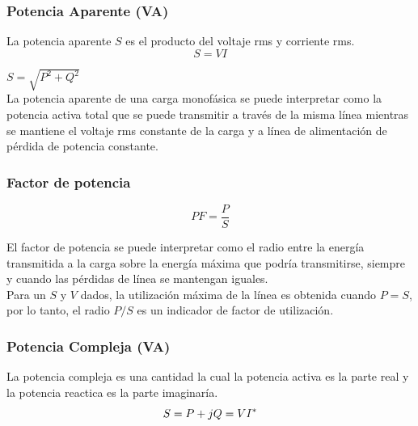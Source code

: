 \subsubsection{Potencia Aparente (VA)}

La potencia aparente $S$ es el producto del voltaje rms y corriente rms.\cite{A30}\\

\begin{equation}\label{EQ19}
S=VI
\end{equation}

$S=\sqrt{P^2+Q^2}$ \\

La potencia aparente de una carga monofásica se puede interpretar como la potencia activa total que se puede transmitir a través de la misma línea mientras se mantiene el voltaje rms constante de la carga y a línea de alimentación  de pérdida de potencia constante.\cite{A30}\\

\subsubsection{Factor de potencia}

\begin{equation}\label{EQ20}
PF=\frac{P}{S}
\end{equation}

El factor de potencia se puede interpretar como el radio entre la energía transmitida a la carga sobre la energía máxima que podría transmitirse, siempre y cuando las pérdidas de línea se mantengan iguales.\cite{A30}\\

Para un $S$ y $V$ dados, la utilización máxima de la línea es obtenida cuando $P=S$, por lo tanto, el radio $P/S$ es un indicador de factor de utilización.\cite{A30}\\
 \subsubsection{Potencia Compleja (VA)}
 
 La potencia compleja es una cantidad la cual la potencia activa es la parte real y la potencia reactica es la parte imaginaría.\cite{A30}\\
 
 \begin{equation}\label{EQ21}
 S = P+jQ =  VI^*\\
\end{equation}  

